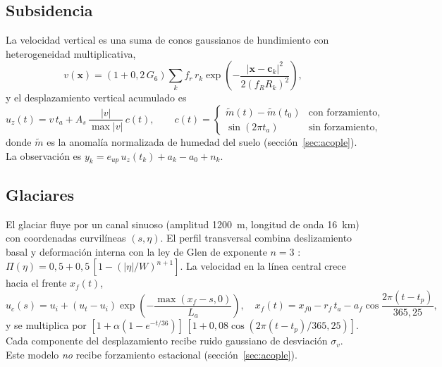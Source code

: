 \documentclass[11pt,a4paper]{article}
\newcommand{\vect}[1]{\mathbf{#1}}
\begin{document}
\subsection{Subsidencia}
La velocidad vertical es una suma de conos gaussianos de hundimiento con heterogeneidad multiplicativa,
\begin{equation}
  v(\vect x) = \left(1 + 0{,}2\,G_6\right)\sum_k f_r\,r_k\exp\!\left(-\frac{|\vect x - \vect c_k|^2}{2(f_R R_k)^2}\right),
\end{equation}
y el desplazamiento vertical acumulado es
\begin{equation}\label{eq:subsidencia}
  u_z(t) = v\,t_a + A_s\,\frac{|v|}{\max|v|}\,c(t),\qquad
  c(t) = \begin{cases}\tilde m(t) - \tilde m(t_0) & \text{con forzamiento},\\ \sin(2\pi t_a) & \text{sin forzamiento},\end{cases}
\end{equation}
donde $\tilde m$ es la anomalía normalizada de humedad del suelo (sección~\ref{sec:acople}). La
observación es $y_k = e_{up}\,u_z(t_k) + a_k - a_0 + n_k$.

\subsection{Glaciares}
El glaciar fluye por un canal sinuoso (amplitud 1200~m, longitud de onda 16~km) con coordenadas
curvilíneas $(s,\eta)$. El perfil transversal combina deslizamiento basal y deformación interna con la
ley de Glen de exponente $n=3$ \cite{glen1955}: $\Pi(\eta) = 0{,}5 + 0{,}5\,[1 - (|\eta|/W)^{n+1}]$. La
velocidad en la línea central crece hacia el frente $x_f(t)$,
\begin{equation}
  u_c(s) = u_i + (u_t-u_i)\exp\!\left(-\frac{\max(x_f - s, 0)}{L_a}\right),\quad
  x_f(t) = x_{f0} - r_f\,t_a - a_f\cos\frac{2\pi(t-t_p)}{365{,}25},
\end{equation}
y se multiplica por $[1 + \alpha(1-e^{-t/36})]\,[1 + 0{,}08\cos(2\pi(t-t_p)/365{,}25)]$. Cada componente
del desplazamiento recibe ruido gaussiano de desviación $\sigma_v$. Este modelo \emph{no} recibe forzamiento
estacional (sección~\ref{sec:acople}).
\end{document}
